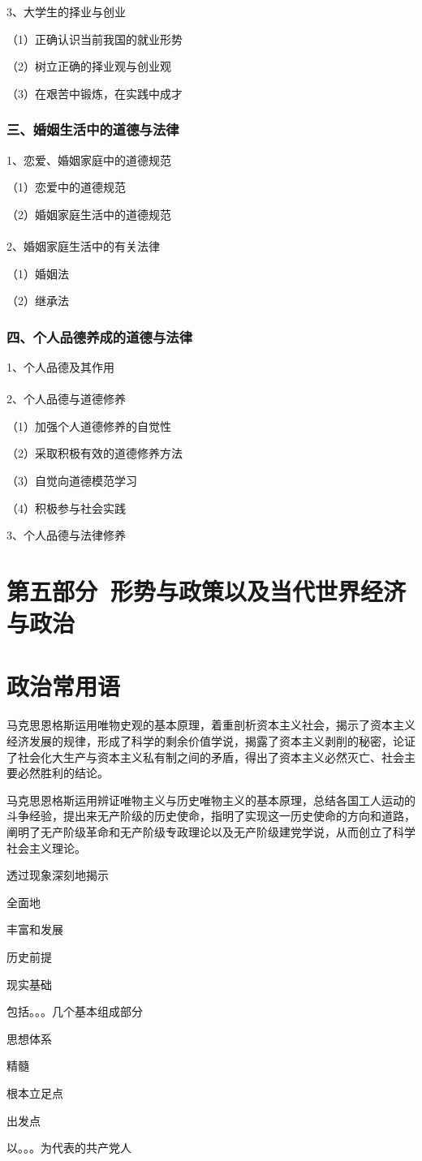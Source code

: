 \documentclass{ctexart}
\begin{document}
3、大学生的择业与创业

（1）正确认识当前我国的就业形势

（2）树立正确的择业观与创业观

（3）在艰苦中锻炼，在实践中成才

\subsubsection{三、婚姻生活中的道德与法律}

1、恋爱、婚姻家庭中的道德规范

（1）恋爱中的道德规范

（2）婚姻家庭生活中的道德规范
\\\\

2、婚姻家庭生活中的有关法律

（1）婚姻法

（2）继承法


\subsubsection{四、个人品德养成的道德与法律}
1、个人品德及其作用
\\\\

2、个人品德与道德修养

（1）加强个人道德修养的自觉性

（2）采取积极有效的道德修养方法

（3）自觉向道德模范学习

（4）积极参与社会实践

3、个人品德与法律修养
\section{第五部分\ 形势与政策以及当代世界经济与政治}

\section{政治常用语}

马克思恩格斯运用唯物史观的基本原理，着重剖析资本主义社会，揭示了资本主义经济发展的规律，形成了科学的剩余价值学说，揭露了资本主义剥削的秘密，论证了社会化大生产与资本主义私有制之间的矛盾，得出了资本主义必然灭亡、社会主要必然胜利的结论。

马克思恩格斯运用辨证唯物主义与历史唯物主义的基本原理，总结各国工人运动的斗争经验，提出来无产阶级的历史使命，指明了实现这一历史使命的方向和道路，阐明了无产阶级革命和无产阶级专政理论以及无产阶级建党学说，从而创立了科学社会主义理论。


透过现象深刻地揭示

全面地

丰富和发展




历史前提

现实基础

包括。。。几个基本组成部分

思想体系

精髓

根本立足点

出发点

以。。。为代表的共产党人
\end{document}
